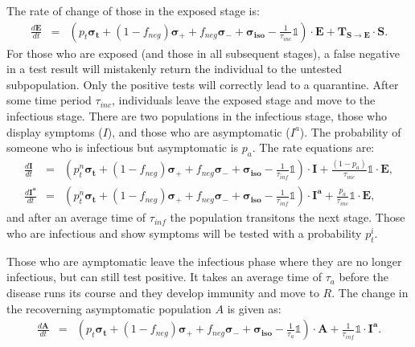 \documentclass[notitlepage, superscriptaddress]{revtex4-2}
\begin{document}
The rate of change of those in the exposed stage is:
\begin{eqnarray} 
\frac{d \boldsymbol{E}}{dt} &=& \left( p_{t} \boldsymbol{\sigma_{t}} + (1-f_{neg}) \boldsymbol{\sigma_{+}} + f_{neg} \boldsymbol{\sigma_{-}} + \boldsymbol{\sigma_{iso}} - \frac{1}{\tau_{inc}} \mathbb{1} \right) \cdot \boldsymbol{E} + \boldsymbol{T_{S \rightarrow E}} \cdot \boldsymbol{S}. 
\end{eqnarray}
For those who are exposed (and those in all subsequent stages), a false negative in a test result will mistakenly return the individual to the untested subpopulation. Only the positive tests will correctly lead to a quarantine. After some time period $\tau_{inc}$, individuals leave the exposed stage and move to the infectious stage. There are two populations in the infectious stage, those who display symptoms ($I$), and those who are asymptomatic ($I^{a}$). The probability of someone who is infectious but asymptomatic is $p_{a}$. The rate equations are:
\begin{eqnarray}
\frac{d \boldsymbol{I}}{dt} &=& \left( p^{n}_{t} \boldsymbol{\sigma_{t}} + (1-f_{neg}) \boldsymbol{\sigma_{+}} + f_{neg} \boldsymbol{\sigma_{-}} + \boldsymbol{\sigma_{iso}} - \frac{1}{\tau_{inf}} \mathbb{1} \right) \cdot \boldsymbol{I} + \frac{(1-p_{a})}{\tau_{inc}} \mathbb{1} \cdot \boldsymbol{E}, \\ 
%
\frac{d \boldsymbol{I^{a}}}{dt} &=& \left( p^{n}_{t} \boldsymbol{\sigma_{t}} + (1-f_{neg}) \boldsymbol{\sigma_{+}} + f_{neg} \boldsymbol{\sigma_{-}} + \boldsymbol{\sigma_{iso}} - \frac{1}{\tau_{inf}} \mathbb{1} \right) \cdot \boldsymbol{I^{a}} + \frac{p_{a}}{\tau_{inc}} \mathbb{1} \cdot \boldsymbol{E},
\end{eqnarray}
and after an average time of $\tau_{inf}$ the population transitons the next stage. Those who are infectious and show symptoms will be tested with a probability $p^{i}_{t}$.

Those who are aymptomatic leave the infectious phase where they are no longer infectious, but can still test positive. It takes an average time of $\tau_{a}$ before the disease runs its course and they develop immunity and move to $R$. The change in the recoverning asymptomatic population $A$ is given as:
\begin{eqnarray}
\frac{d \boldsymbol{A}}{dt} &=& \left( p_{t} \boldsymbol{\sigma_{t}} + (1-f_{neg}) \boldsymbol{\sigma_{+}} + f_{neg} \boldsymbol{\sigma_{-}} + \boldsymbol{\sigma_{iso}} - \frac{1}{\tau_{a}} \mathbb{1} \right) \cdot \boldsymbol{A} + \frac{1}{\tau_{inf}} \mathbb{1} \cdot \boldsymbol{I^{a}}.
\end{eqnarray}
\end{document}
